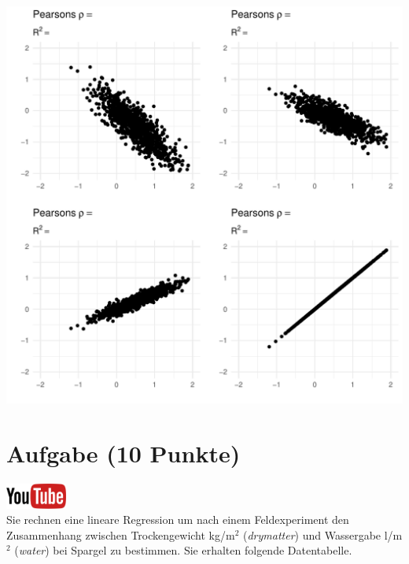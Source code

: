 \documentclass[a4paper, 9pt]{scrartcl}\usepackage[]{graphicx}\usepackage[]{xcolor}
\makeatletter
\def\maxwidth{ %
  \ifdim\Gin@nat@width>\linewidth
    \linewidth
  \else
    \Gin@nat@width
  \fi
}
\makeatother
\begin{document}
{\centering \includegraphics[width=\maxwidth]{img/correlation-02-1} 

}



 
\clearpage

\section{Aufgabe \hfill (10 Punkte)}

\hfill\href{https://youtu.be/dyQlYV9nOqY}{\includegraphics[width =
  2cm]{img/youtube}}\\[1Ex]

Sie rechnen eine lineare Regression um nach einem Feldexperiment den
Zusammenhang zwischen Trockengewicht kg/m$^2$ (\textit{drymatter}) und
Wassergabe l/m$^2$ (\textit{water}) bei Spargel zu bestimmen. Sie erhalten
folgende Datentabelle.
\end{document}
